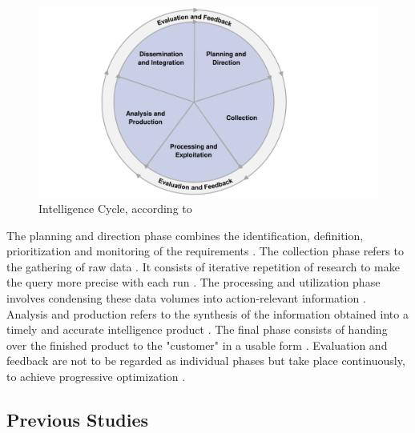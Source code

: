 \documentclass[10pt]{article}
\begin{document}
\begin{figure}[h]
    \centering
    \includegraphics[clip,width=0.8\linewidth]{PDF/images/crop_Intelligence Cycle}
    \caption{Intelligence Cycle, according to \cite{JointChiefsofStaffU.S.Army.2013}}
    \label{fig: intelligence cycle}
\end{figure}

The planning and direction phase combines the identification, definition, prioritization and monitoring
of the requirements \cite{JointChiefsofStaffU.S.Army.2013}.
The collection phase refers to the gathering of raw data \cite{CentralIntelligenceAgency.1987}.
It consists of iterative repetition of research
\cite{NorthAtlanticTreatyOrganization.2001} to make the query more precise with each run
\cite{PastorGalindo.2020}. The processing and utilization phase involves condensing
these data volumes into action-relevant information
\cite{JointChiefsofStaffU.S.Army.2013}.
Analysis and production refers to the synthesis of the information obtained into a timely and accurate intelligence product
\cite{Hwang.2022, NorthAtlanticTreatyOrganization.2001}.
The final phase consists of handing over the finished product to the "customer" in a
usable form \cite{CentralIntelligenceAgency.2023, Williams.2018}.
Evaluation and feedback are not to be regarded as individual phases
but take place continuously, to achieve progressive optimization
\cite{JointChiefsofStaffU.S.Army.2013, NorthAtlanticTreatyOrganization.2001}.

\subsection{Previous Studies}
\end{document}
